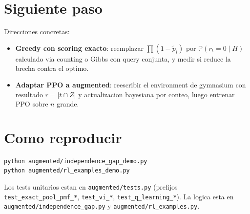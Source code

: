 \documentclass[11pt]{article}
\begin{document}
\section{Siguiente paso}
\label{sec:siguiente}

Direcciones concretas:
\begin{itemize}
  \item \textbf{Greedy con scoring exacto}: reemplazar
    $\prod(1 - \tilde p_i)$ por $\mathbb{P}(r_t = 0 \mid H)$ calculado
    via counting o Gibbs con query conjunta, y medir si reduce la
    brecha contra el optimo.
  \item \textbf{Adaptar PPO a augmented}: reescribir el environment de
    gymnasium con resultado $r = \lvert t \cap Z \rvert$ y actualizacion
    bayesiana por conteo, luego entrenar PPO sobre $n$ grande.
\end{itemize}

\section{Como reproducir}

\begin{verbatim}
python augmented/independence_gap_demo.py
python augmented/rl_examples_demo.py
\end{verbatim}

Los tests unitarios estan en \texttt{augmented/tests.py} (prefijos
\texttt{test\_exact\_pool\_pmf\_*}, \texttt{test\_vi\_*},
\texttt{test\_q\_learning\_*}). La logica esta en
\texttt{augmented/independence\_gap.py} y
\texttt{augmented/rl\_examples.py}.
\end{document}
